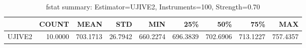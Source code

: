 \begin{table}[ht]
\centering
\caption{fstat summary: Estimator=UJIVE2, Instruments=100, Strength=0.70}
\begin{tabular}{lrrrrrrrr}
\toprule
 & COUNT & MEAN & STD & MIN & 25\% & 50\% & 75\% & MAX \\
\midrule
UJIVE2 & 10.0000 & 703.1713 & 26.7942 & 660.2274 & 696.3839 & 702.6906 & 713.1227 & 757.4357 \\
\bottomrule
\end{tabular}
\end{table}
